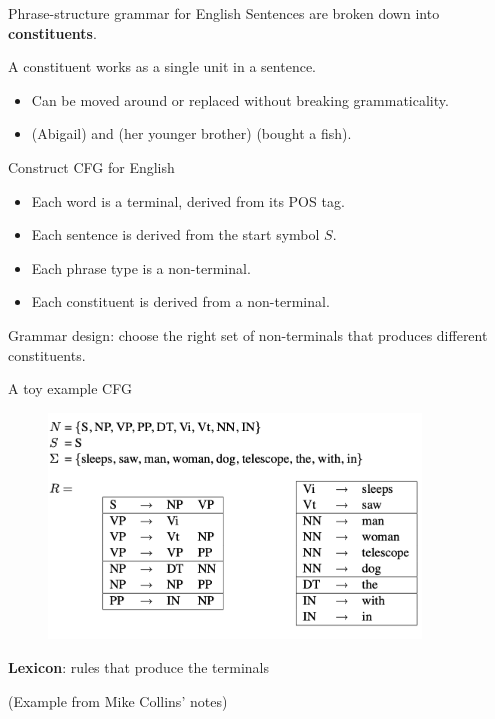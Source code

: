 \documentclass[usenames,dvipsnames,notes,11pt,aspectratio=169]{beamer}
\begin{document}
\begin{frame}
    {Phrase-structure grammar for English}
    Sentences are broken down into \textbf{constituents}.

    A constituent works as a single unit in a sentence.\\
    \begin{itemize}
        \item Can be moved around or replaced without breaking grammaticality.
        \item[] (Abigail) and (her younger brother) (bought a fish).
    \end{itemize}

    Construct CFG for English\\
    \begin{itemize}
        \item Each word is a terminal, derived from its POS tag.
        \item Each sentence is derived from the start symbol $S$.
        \item Each phrase type is a non-terminal.
        \item Each constituent is derived from a non-terminal.
    \end{itemize}

    Grammar design: choose the right set of non-terminals that produces different constituents.
\end{frame}

\begin{frame}
    {A toy example CFG}
    \begin{figure}    
        \includegraphics[height=6cm]{figures/toy-cfg.png}
    \end{figure}   
    \vspace{-2em}
    \textbf{Lexicon}: rules that produce the terminals

    (Example from Mike Collins' notes)
\end{frame}
\end{document}
